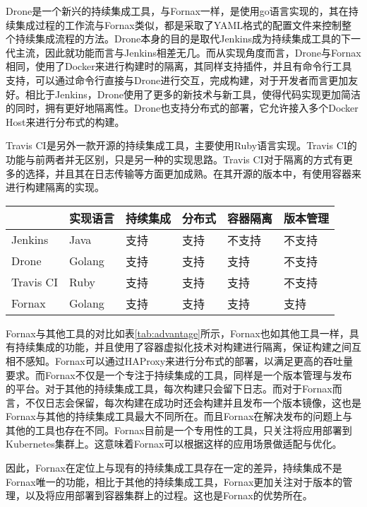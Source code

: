 Drone是一个新兴的持续集成工具，与Fornax一样，是使用go语言实现的，其在持续集成过程的工作流与Fornax类似，都是采取了YAML格式的配置文件来控制整个持续集成流程的方法。Drone本身的目的是取代Jenkins成为持续集成工具的下一代主流，因此就功能而言与Jenkins相差无几。而从实现角度而言，Drone与Fornax相同，使用了Docker来进行构建时的隔离，其同样支持插件，并且有命令行工具支持，可以通过命令行直接与Drone进行交互，完成构建，对于开发者而言更加友好。相比于Jenkins，Drone使用了更多的新技术与新工具，使得代码实现更加简洁的同时，拥有更好地隔离性。Drone也支持分布式的部署，它允许接入多个Docker Host来进行分布式的构建。

Travis CI是另外一款开源的持续集成工具，主要使用Ruby语言实现。Travis CI的功能与前两者并无区别，只是另一种的实现思路。Travis CI对于隔离的方式有更多的选择，并且其在日志传输等方面更加成熟。在其开源的版本中，有使用容器来进行构建隔离的实现。

\begin{table}[!hpb]
  \centering
  \begin{tabular}{l||lllll} \toprule
     & 实现语言 & 持续集成 & 分布式 & 容器隔离 & 版本管理 \\ \midrule
    Jenkins & Java & 支持 & 支持 & 不支持 & 不支持 \\
    Drone & Golang & 支持 & 支持 & 支持 & 不支持 \\
    Travis CI & Ruby & 支持 & 支持 & 支持 & 不支持 \\
    Fornax & Golang & 支持 & 支持 & 支持 & 支持 \\ \bottomrule
  \end{tabular}
\end{table}

Fornax与其他工具的对比如表\ref{tab:advantage}所示，Fornax也如其他工具一样，具有持续集成的功能，并且使用了容器虚拟化技术对构建进行隔离，保证构建之间互相不感知。Fornax可以通过HAProxy来进行分布式的部署，以满足更高的吞吐量要求。而Fornax不仅是一个专注于持续集成的工具，同样是一个版本管理与发布的平台。对于其他的持续集成工具，每次构建只会留下日志。而对于Fornax而言，不仅日志会保留，每次构建在成功时还会构建并且发布一个版本镜像，这也是Fornax与其他的持续集成工具最大不同所在。而且Fornax在解决发布的问题上与其他的工具也存在不同。Fornax目前是一个专用性的工具，只关注将应用部署到Kubernetes集群上。这意味着Fornax可以根据这样的应用场景做适配与优化。

因此，Fornax在定位上与现有的持续集成工具存在一定的差异，持续集成不是Fornax唯一的功能，相比于其他的持续集成工具，Fornax更加关注对于版本的管理，以及将应用部署到容器集群上的过程。这也是Fornax的优势所在。